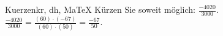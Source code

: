 \begin{MAufgabe}{Kuerzen}{kr, dh, MaTeX}
K\"urzen Sie soweit m\"oglich: $\frac{-4020}{3000}$.\\ 
\ifLsg\MLoesung
\quad $\frac{-4020}{3000}=\frac{(60)\cdot(-67)}{(60)\cdot(50)}=\frac{-67}{50}$.\else\relax\fi
 \end{MAufgabe}